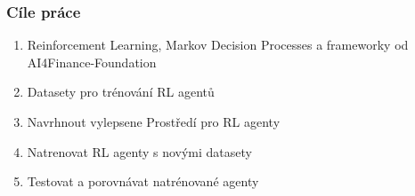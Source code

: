





\begin{frame}
    \frametitle{Cíle práce}
    \begin{enumerate}
        \itemsep1em
        \item Reinforcement Learning, Markov Decision Processes a frameworky od AI4Finance-Foundation
        \item Datasety pro trénování RL agentů
        \item Navrhnout vylepsene Prostředí pro RL agenty
        \item Natrenovat RL agenty s novými datasety
        \item Testovat a porovnávat natrénované agenty
    \end{enumerate}
\end{frame}

